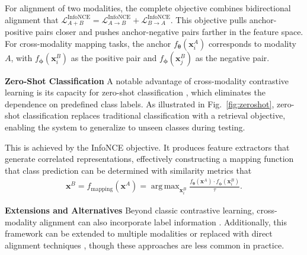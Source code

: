 \documentclass[journal]{IEEEtran}
\DeclareMathOperator*{\argmax}{arg\,max}
\begin{document}
For alignment of two modalities, the complete objective combines bidirectional alignment that $\mathcal{L}_{A + B}^{\text{InfoNCE}} = \mathcal{L}_{A \rightarrow B}^{\text{InfoNCE}} + \mathcal{L}_{B \rightarrow A}^{\text{InfoNCE}}$. This objective pulls anchor-positive pairs closer and pushes anchor-negative pairs farther in the feature space. For cross-modality mapping tasks, the anchor $f_{\boldsymbol{\theta}}(\mathbf{x}_{i}^{A})$ corresponds to modality $A$, with $f_{\boldsymbol{\phi}}(\mathbf{x}_{i}^{B})$ as the positive pair and $f_{\boldsymbol{\phi}}(\mathbf{x}_{j}^{B})$ as the negative pair.

\textbf{Zero-Shot Classification} A notable advantage of cross-modality contrastive learning is its capacity for zero-shot classification \cite{Lampert2009, Socher2013}, which eliminates the dependence on predefined class labels. As illustrated in Fig.~\ref{fig:zeroshot}, zero-shot classification replaces traditional classification with a retrieval objective, enabling the system to generalize to unseen classes during testing.

This is achieved by the InfoNCE objective. It produces feature extractors that generate correlated representations, effectively constructing a mapping function that class prediction can be determined with similarity metrics that
\begin{align}
\mathbf{x}^{B} = f_{\text{mapping}} (\mathbf{x}^{A})= \argmax_{\mathbf{x}_{i}^{B}} \frac{f_{\boldsymbol{\theta}} (\mathbf{x}^{A}) \cdot f_{\boldsymbol{\phi}}{(\mathbf{x}_{i}^{B})}}{\tau}.
\end{align}

\begin{figure*}[htpb]
\centering
{}
\caption{Zero-shot classification under cross-modality contrastive learning, using visual decoding as an example. (a) Training stage, where feature extractors for image and brain signal pairings are learned in the latent space using cross-modality contrastive learning. (b) Test stage, where novel classes that were not present in the training set require classification. Retrieval could be performed using similarity metrics in the latent space.} \label{fig:zeroshot}
\end{figure*}

\textbf{Extensions and Alternatives} Beyond classic contrastive learning, cross-modality alignment can also incorporate label information \cite{Yang2022, Khosla2020}. Additionally, this framework can be extended to multiple modalities \cite{Mai2022, Lin2022} or replaced with direct alignment techniques \cite{Dou2022, Bao2022}, though these approaches are less common in practice.
\end{document}
